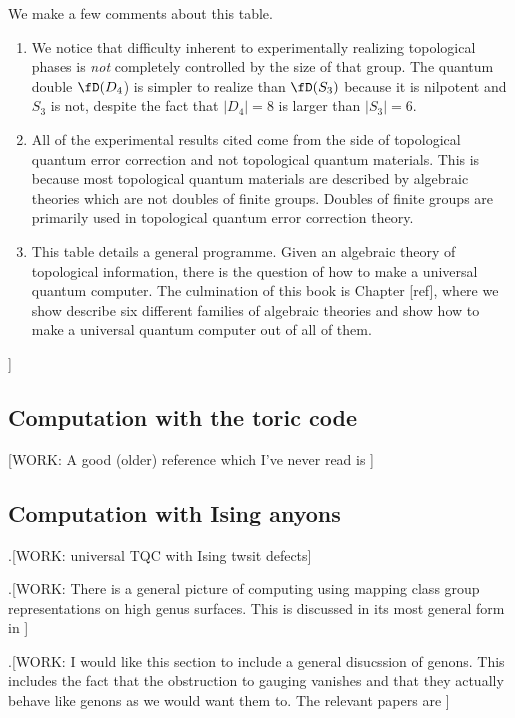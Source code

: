 We make a few comments about this table.

\begin{enumerate}
\item We notice that difficulty inherent to experimentally realizing topological phases is \textit{not} completely controlled by the size of that group. The quantum double $\fD(D_4$) is simpler to realize than $\fD(S_3)$ because it is nilpotent and $S_3$ is not, despite the fact that $|D_4|=8$ is larger than $|S_3|=6$.

\item All of the experimental results cited come from the side of topological quantum error correction and not topological quantum materials. This is because most topological quantum materials are described by algebraic theories which are not doubles of finite groups. Doubles of finite groups are primarily used in topological quantum error correction theory.

\item This table details a general programme. Given an algebraic theory of topological information, there is the question of how to make a universal quantum computer. The culmination of this book is Chapter [ref], where we show describe six different families of algebraic theories and show how to make a universal quantum computer out of all of them.

\end{enumerate}
]
\subsection{Computation with the toric code}

[WORK: A good (older) reference which I've never read is \cite{dennis2002topological}]


\subsection{Computation with Ising anyons}

.[WORK: universal TQC with Ising twsit defects]

.[WORK: There is a general picture of computing using mapping class group representations on high genus surfaces. This is discussed in its most general form in \cite{bloomquist2018topological}]


.[WORK: I would like this section to include a general disucssion of genons. This includes the fact that the obstruction to gauging vanishes and that they actually behave like genons as we would want them to. The relevant papers are \cite{gannon2019vanishing, delaney2019categorical, barkeshli2013twist}]


